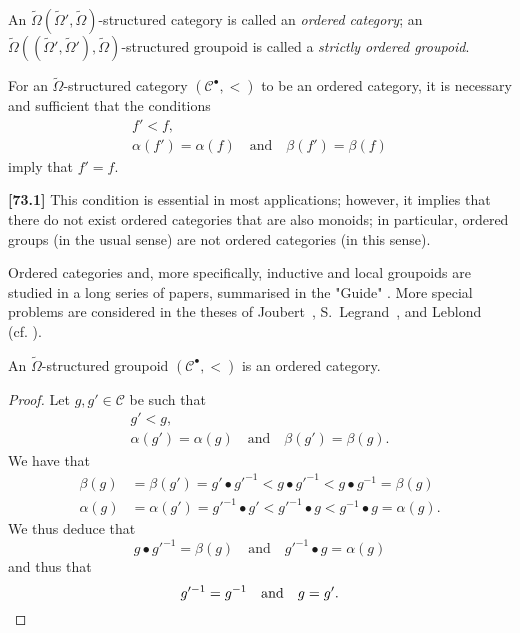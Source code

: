 \documentclass[a4paper,fleqn]{article}
\theoremstyle{plain}
\newenvironment{proposition}[1]
  {\renewcommand\theinnerproposition{#1}\innerproposition}
  {\endinnerproposition}
\theoremstyle{definition}
\newenvironment{definition}[1]
  {\renewcommand\theinnerdefinition{#1}\innerdefinition}
  {\endinnerdefinition}
\newenvironment{longcomm}[1]
  {\noindent\textbf{[#1]}\rmfamily}
  {}
\newcommand{\oldpage}[1]{{\marginpar{\footnotesize$\bigg\vert$\,\,\,\,\textit{p.~#1}}}}
\newcommand{\textand}{\quad\text{and}\quad}
\newcommand{\CC}{\mathcal{C}}
\begin{document}
\begin{definition}{18}
\label{definition:ii-18}
  An $\widetilde{\Omega}(\widetilde{\Omega}',\widetilde{\Omega})$-structured category is called an \emph{ordered category};
  an $\widetilde{\Omega}((\widetilde{\Omega}',\widetilde{\Omega}'),\widetilde{\Omega})$-structured groupoid is called a \emph{strictly ordered groupoid}.
\end{definition}

For an $\widetilde{\Omega}$-structured category $(\CC^\bullet,<)$ to be an ordered category, it is necessary and sufficient that the conditions
\[
  \begin{gathered}
    f'<f,
  \\\alpha(f')=\alpha(f)
    \textand
    \beta(f')=\beta(f)
  \end{gathered}
\]
imply that $f'=f$.

\begin{longcomm}{73.1}
  This condition is essential in most applications;
  however, it implies that there do not exist ordered categories that are also monoids;
  in particular, ordered groups (in the usual sense) are not ordered categories (in this sense).

  Ordered categories and, more specifically, inductive and local groupoids are studied in a long series of papers, summarised in the "Guide" \cite{coll86}.
  More special problems are considered in the theses of Joubert~\cite{comm57}, S.~Legrand~\cite{comm68}, and Leblond~\cite{comm66} (cf. \cite[Part~II]{coll}).
\end{longcomm}

\begin{proposition}{18}
\label{proposition:ii-18}
  \oldpage{74}
  An $\widetilde{\Omega}$-structured groupoid $(\CC^\bullet,<)$ is an ordered category.
\end{proposition}

\begin{proof}
  Let $g,g'\in\CC$ be such that
  \[
    \begin{gathered}
      g'<g,
    \\\alpha(g')=\alpha(g)
      \textand
      \beta(g')=\beta(g).
    \end{gathered}
  \]
  We have that
  \[
    \begin{aligned}
      \beta(g)
      &= \beta(g')
      = g'\bullet g'^{-1}
      < g\bullet g'^{-1}
      < g\bullet g^{-1}
      = \beta(g)
    \\\alpha(g)
      &= \alpha(g')
      = g'^{-1}\bullet g'
      < g'^{-1}\bullet g
      < g^{-1}\bullet g
      = \alpha(g).
    \end{aligned}
  \]
  We thus deduce that
  \[
    g\bullet g'^{-1} = \beta(g)
    \textand
    g'^{-1}\bullet g = \alpha(g)
  \]
  and thus that
  \[
    g'^{-1}=g^{-1}
    \textand
    g=g'.
    \qedhere
  \]
\end{proof}
\end{document}
